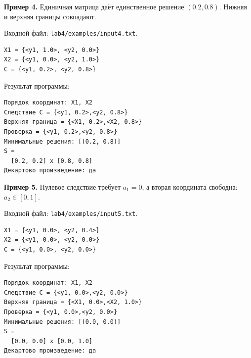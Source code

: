 \documentclass[14pt,a4paper]{extarticle}
\begin{document}
\par\medskip
\noindent\begin{minipage}{\textwidth}
\noindent\textbf{Пример 4.} Единичная матрица даёт единственное решение $(0.2,0.8)$. Нижняя и верхняя границы совпадают.

Входной файл: \texttt{lab4/examples/input4.txt}.
\begin{Verbatim}[fontsize=\small,baselinestretch=1,frame=single,breaklines=true]
X1 = {<y1, 1.0>, <y2, 0.0>}
X2 = {<y1, 0.0>, <y2, 1.0>}
C = {<y1, 0.2>, <y2, 0.8>}
\end{Verbatim}

Результат программы:
\begin{Verbatim}[fontsize=\small,baselinestretch=1,frame=single,breaklines=true]
Порядок координат: X1, X2
Следствие C = {<y1, 0.2>,<y2, 0.8>}
Верхняя граница = {<X1, 0.2>,<X2, 0.8>}
Проверка = {<y1, 0.2>,<y2, 0.8>}
Минимальные решения: [(0.2, 0.8)]
S =
  [0.2, 0.2] x [0.8, 0.8]
Декартово произведение: да
\end{Verbatim}
\end{minipage}

\par\medskip
\noindent\begin{minipage}{\textwidth}
\noindent\textbf{Пример 5.} Нулевое следствие требует $a_1=0$, а вторая координата свободна: $a_2\in[0,1]$.

Входной файл: \texttt{lab4/examples/input5.txt}.
\begin{Verbatim}[fontsize=\small,baselinestretch=1,frame=single,breaklines=true]
X1 = {<y1, 0.0>, <y2, 0.4>}
X2 = {<y1, 0.0>, <y2, 0.0>}
C = {<y1, 0.0>, <y2, 0.0>}
\end{Verbatim}

Результат программы:
\begin{Verbatim}[fontsize=\small,baselinestretch=1,frame=single,breaklines=true]
Порядок координат: X1, X2
Следствие C = {<y1, 0.0>,<y2, 0.0>}
Верхняя граница = {<X1, 0.0>,<X2, 1.0>}
Проверка = {<y1, 0.0>,<y2, 0.0>}
Минимальные решения: [(0.0, 0.0)]
S =
  [0.0, 0.0] x [0.0, 1.0]
Декартово произведение: да
\end{Verbatim}
\end{minipage}
\end{document}
